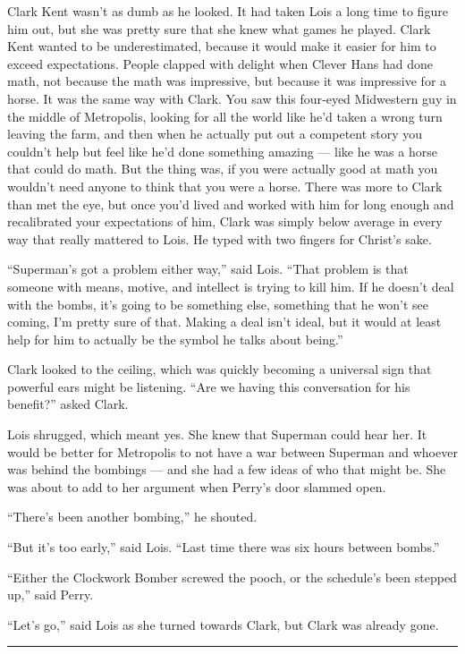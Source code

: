 Clark Kent wasn't as dumb as he looked. It had taken Lois a long time to
figure him out, but she was pretty sure that she knew what games he
played. Clark Kent wanted to be underestimated, because it would make it
easier for him to exceed expectations. People clapped with delight when
Clever Hans had done math, not because the math was impressive, but
because it was impressive for a horse. It was the same way with Clark.
You saw this four‐eyed Midwestern guy in the middle of Metropolis,
looking for all the world like he'd taken a wrong turn leaving the farm,
and then when he actually put out a competent story you couldn't help
but feel like he'd done something amazing --- like he was a horse that
could do math. But the thing was, if you were actually good at math you
wouldn't need anyone to think that you were a horse. There was more to
Clark than met the eye, but once you'd lived and worked with him for
long enough and recalibrated your expectations of him, Clark was simply
below average in every way that really mattered to Lois. He typed with
two fingers for Christ's sake.

``Superman's got a problem either way,'' said Lois. ``That problem is
that someone with means, motive, and intellect is trying to kill him. If
he doesn't deal with the bombs, it's going to be something else,
something that he won't see coming, I'm pretty sure of that. Making a
deal isn't ideal, but it would at least help for him to actually be the
symbol he talks about being.''

Clark looked to the ceiling, which was quickly becoming a universal sign
that powerful ears might be listening. ``Are we having this conversation
for his benefit?'' asked Clark.

Lois shrugged, which meant yes. She knew that Superman could hear her.
It would be better for Metropolis to not have a war between Superman and
whoever was behind the bombings --- and she had a few ideas of who that
might be. She was about to add to her argument when Perry's door slammed
open.

``There's been another bombing,'' he shouted.

``But it's too early,'' said Lois. ``Last time there was six hours
between bombs.''

``Either the Clockwork Bomber screwed the pooch, or the schedule's been
stepped up,'' said Perry.

``Let's go,'' said Lois as she turned towards Clark, but Clark was
already gone.

\begin{center}\rule{0.5\linewidth}{\linethickness}\end{center}

